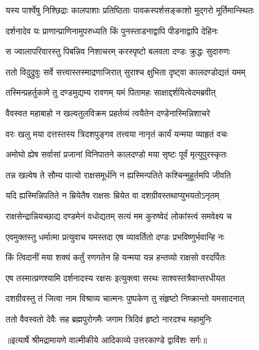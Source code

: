 \twolineshloka
{यस्य पार्श्वेषु निश्छिद्राः कालपाशाः प्रतिष्ठिताः}
{पावकस्पर्शसङ्काशो मुद्गरो मूर्तिमान्स्थितः} %

\twolineshloka
{दर्शनादेव यः प्राणान्प्राणिनामुपरुध्यति}
{किं पुनस्ताडनाद्वापि पीडनाद्वापि देहिनः} %

\twolineshloka
{स ज्वालापरिवारस्तु पिबन्निव निशाचरम्}
{करस्पृष्टो बलवता दण्डः क्रुद्धः सुदारुणः} %

\twolineshloka
{ततो विदुद्रुवुः सर्वे सत्त्वास्तस्माद्रणाजिरात्}
{सुराश्च क्षुभिता दृष्ट्वा कालदण्डोद्यतं यमम्} %

\twolineshloka
{तस्मिन्प्रहर्तुकामे तु दण्डमुद्यम्य रावणम्}
{यमं पितामहः साक्षाद्दर्शयित्वेदमब्रवीत्} %

\twolineshloka
{वैवस्वत महाबाहो न खल्वतुलविक्रम}
{प्रहर्तव्यं त्वयैतेन दण्डेनास्मिन्निशाचरे} %

\twolineshloka
{वरः खलु मया दत्तस्तस्य त्रिदशपुङ्गव}
{तत्त्वया नानृतं कार्यं यन्मया व्याहृतं वचः} %

\twolineshloka
{अमोघो ह्येष सर्वासां प्रजानां विनिपातने}
{कालदण्डो मया सृष्टः पूर्वं मृत्युपुरस्कृतः} %

\twolineshloka
{तन्न खल्वेष ते सौम्य पात्यो राक्षसमूर्धनि}
{न ह्यस्मिन्पतिते कश्चिन्मुहूर्तमपि जीवति} %

\twolineshloka
{यदि ह्यस्मिन्निपतिते न म्रियेतैष राक्षसः}
{म्रियेत वा दशग्रीवस्तथाप्युभयतोऽनृतम्} %

\twolineshloka
{राक्षसेन्द्रान्नियच्छाद्य दण्डमेनं वधोद्यतम्}
{सत्यं मम कुरुष्वेदं लोकांस्त्वं समवेक्ष्य च} %

\twolineshloka
{एवमुक्तस्तु धर्मात्मा प्रत्युवाच यमस्तदा}
{एष व्यावर्तितो दण्डः प्रभविष्णुर्भवान्हि नः} %

\twolineshloka
{किं त्विदानीं मया शक्यं कर्तुं रणगतेन हि}
{यन्मया यन्न हन्तव्यो राक्षसो वरदर्पितः} %

\twolineshloka
{एष तस्मात्प्रणश्यामि दर्शनादस्य रक्षसः}
{इत्युक्त्वा सरथः साश्वस्तत्रैवान्तरधीयत} %

\twolineshloka
{दशग्रीवस्तु तं जित्वा नाम विश्राव्य चात्मनः}
{पुष्पकेण तु संहृष्टो निष्क्रान्तो यमसादनात्} %

\twolineshloka
{ततो वैवस्वतो देवैः सह ब्रह्मपुरोगमैः}
{जगाम त्रिदिवं हृष्टो नारदश्च महामुनिः} %


{॥इत्यार्षे श्रीमद्रामायणे वाल्मीकीये आदिकाव्ये उत्तरकाण्डे द्वाविंशः सर्गः॥}

